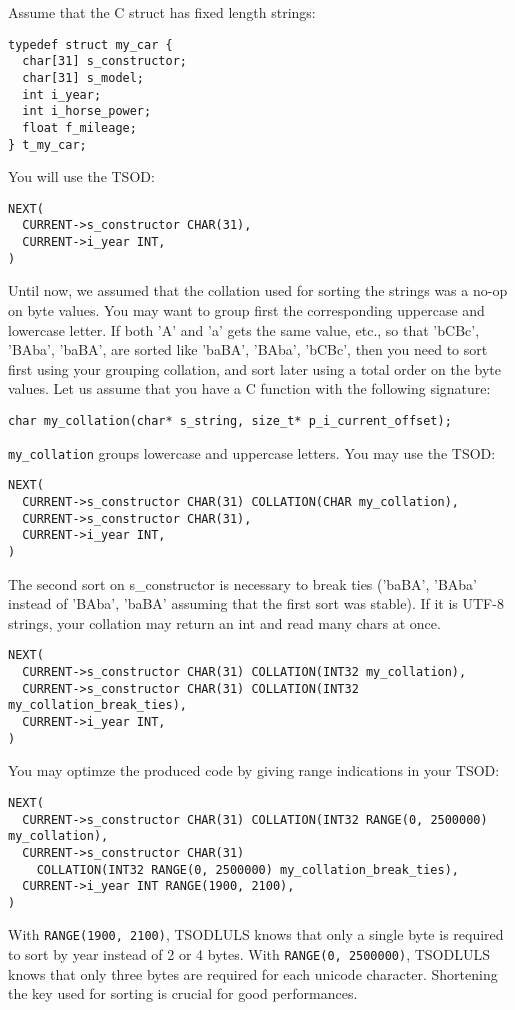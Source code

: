 \documentclass[a4paper,11pt]{report}
\begin{document}
Assume that the C struct has fixed length strings:
\begin{verbatim}
typedef struct my_car {
  char[31] s_constructor;
  char[31] s_model;
  int i_year;
  int i_horse_power;
  float f_mileage;
} t_my_car;
\end{verbatim}
You will use the TSOD:
\begin{verbatim}
NEXT(
  CURRENT->s_constructor CHAR(31),
  CURRENT->i_year INT,
)
\end{verbatim}

Until now, we assumed that the collation used for sorting the strings was a no-op on byte values.
You may want to group first the corresponding uppercase and lowercase letter.
If both 'A' and 'a' gets the same value, etc.,
so that 'bCBc', 'BAba', 'baBA',  are sorted
like 'baBA', 'BAba', 'bCBc',
then you need to sort first using your grouping collation,
and sort later using a total order on the byte values.
Let us assume that you have a C function with the following signature:
\begin{verbatim}
char my_collation(char* s_string, size_t* p_i_current_offset);
\end{verbatim}
\verb?my_collation? groups lowercase and uppercase letters.
You may use the TSOD:
\begin{verbatim}
NEXT(
  CURRENT->s_constructor CHAR(31) COLLATION(CHAR my_collation),
  CURRENT->s_constructor CHAR(31),
  CURRENT->i_year INT,
)
\end{verbatim}
The second sort on s\_constructor is necessary to break ties
('baBA', 'BAba' instead of 'BAba', 'baBA' assuming that the first sort was stable).
If it is UTF-8 strings, your collation may return an int and read many chars at once.
\begin{verbatim}
NEXT(
  CURRENT->s_constructor CHAR(31) COLLATION(INT32 my_collation),
  CURRENT->s_constructor CHAR(31) COLLATION(INT32 my_collation_break_ties),
  CURRENT->i_year INT,
)
\end{verbatim}

You may optimze the produced code by giving range indications in your TSOD:
\begin{verbatim}
NEXT(
  CURRENT->s_constructor CHAR(31) COLLATION(INT32 RANGE(0, 2500000) my_collation),
  CURRENT->s_constructor CHAR(31)
    COLLATION(INT32 RANGE(0, 2500000) my_collation_break_ties),
  CURRENT->i_year INT RANGE(1900, 2100),
)
\end{verbatim}
With \verb?RANGE(1900, 2100)?, TSODLULS knows that only a single byte is required to sort by year instead of 2 or 4 bytes.
With \verb?RANGE(0, 2500000)?, TSODLULS knows that only three bytes are required for each unicode character.
Shortening the key used for sorting is crucial for good performances.
\end{document}
